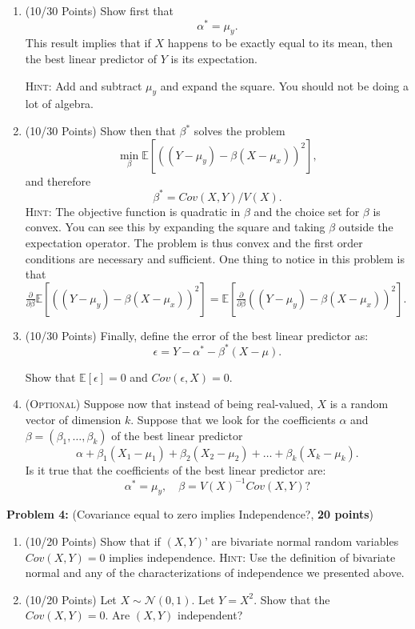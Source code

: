 \documentclass[11pt]{article} %
\begin{document}
\begin{enumerate}
\item (10/30 Points) Show first that 
\[ \alpha^* = \mu_y. \]
This result implies that if $X$ happens to be exactly equal to its mean, then the best linear predictor of $Y$ is its expectation.

{\scshape Hint:} Add and subtract $\mu_y$ and expand the square. You should not be doing a lot of algebra. \\
 
\item (10/30 Points) Show then that $\beta^*$ solves the problem
\[ \min_{\beta} \mathbb{E}[ ((Y-\mu_y) - \beta (X-\mu_x))^2 ], \]
and therefore 
\[ \beta^*  = Cov(X,Y) / V(X). \]
{\scshape Hint:} The objective function is quadratic in $\beta$ and the choice set for $\beta$ is convex. You can see this by expanding the square and taking $\beta$ outside the expectation operator. The problem is thus convex and the first order conditions are necessary and sufficient. One thing to notice in this problem is that $\frac{\partial}{\partial \beta}\mathbb{E}[ ((Y-\mu_y) - \beta (X-\mu_x))^2 ] = \mathbb{E}[  \frac{\partial}{\partial \beta}((Y-\mu_y) - \beta (X-\mu_x))^2 ]$.

\item (10/30 Points) Finally, define the error of the best linear predictor as:
\[ \epsilon = Y - \alpha^* - \beta^*(X-\mu).\]

Show that $\mathbb{E}[\epsilon]=0$ and $Cov(\epsilon,X) = 0$. 


\item ({\scshape Optional}) Suppose now that instead of being real-valued, $X$ is a random vector of dimension $k$. Suppose that we look for the coefficients $\alpha$ and $\beta = (\beta_1, \ldots, \beta_k)$ of the best linear predictor
\[ \alpha + \beta_1 ( X_1 -\mu_{1} ) + \beta_2 (X_2- \mu_2) + \ldots + \beta_{k} (X_k - \mu_k). \]
Is it true that the coefficients of the best linear predictor are:
\[ \alpha^* = \mu_y, \quad \beta = V(X)^{-1} Cov(X,Y) ? \]
\end{enumerate}
 
 
 
\noindent \textbf{Problem 4:} (Covariance equal to zero implies Independence?, \textbf{20 points}) 

\begin{enumerate}
\item (10/20 Points) Show that if $(X,Y)’$ are bivariate normal random variables $Cov(X,Y)=0$ implies independence. {\scshape Hint:} Use the definition of bivariate normal and any of the characterizations of independence we presented above.
\item (10/20 Points) Let $X \sim \mathcal{N}(0,1)$. Let $Y=X^2$. Show that the $Cov(X,Y) = 0$. Are $(X,Y)$ independent? \end{enumerate}
\end{document}

